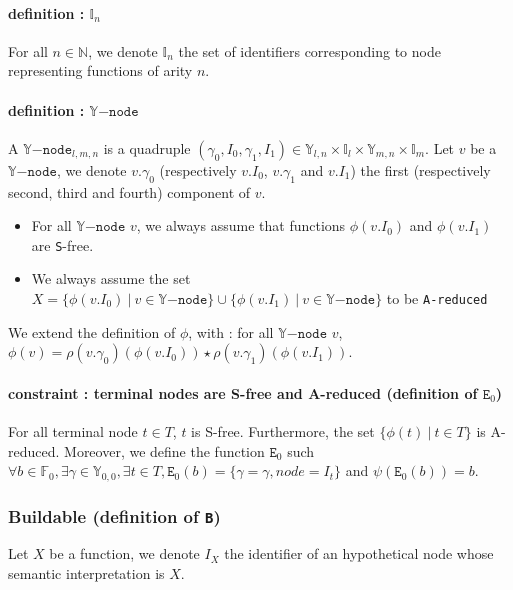 \documentclass[a4paper,10pt]{article}
\newcommand{\N}{\mathbb{N}}%
\newcommand{\F}{\mathbb{F}}%
\newcommand{\Y}{\mathbb{Y}}%
\newcommand{\I}{\mathbb{I}}%
\newcommand{\Ynode}{\Y\mathtt{-node}}
\begin{document}
\paragraph{definition : $\I_n$\\}
For all $n\in\N$, we denote $\I_n$ the set of identifiers corresponding to node representing functions of arity $n$.

\paragraph{definition : $\Ynode$\\}
A $\Ynode_{l, m, n}$ is a quadruple $(\gamma_0, I_0, \gamma_1, I_1) \in \Y_{l, n} \times \I_l \times \Y_{m, n} \times \I_m$. Let $v$ be a $\Ynode$, we denote $v.\gamma_0$ (respectively $v.I_0$, $v.\gamma_1$ and $v.I_1$) the first (respectively second, third and fourth) component of $v$.
\begin{itemize}
\item For all $\Ynode$ $v$, we always assume that functions $\phi(v.I_0)$ and $\phi(v.I_1)$ are \texttt{S}-free.
\item We always assume the set $X = \{\phi(v.I_0) ~|~ v \in\Ynode\} \cup \{\phi(v.I_1) ~|~ v\in\Ynode\}$ to be \texttt{A-reduced}
\end{itemize}
We extend the definition of $\phi$, with : for all $\Ynode$ $v$, $\phi(v) = \rho(v.\gamma_0)(\phi(v.I_0)) \star \rho(v.\gamma_1)(\phi(v.I_1))$.

\paragraph{constraint : terminal nodes are S-free and A-reduced (definition of $\mathtt{E}_0$)}
For all terminal node $t \in T$, $t$ is S-free.
Furthermore, the set $\{\phi(t) ~|~ t\in T\}$ is A-reduced.
Moreover, we define the function $\mathtt{E}_0$ such $\forall b\in\F_0, \exists \gamma\in\Y_{0, 0}, \exists t\in T, \mathtt{E}_0(b) = \{\gamma = \gamma, node = I_t\}$ and $\psi(\mathtt{E}_0(b)) = b$.


\subsubsection{Buildable (definition of \texttt{B})}

Let $X$ be a function, we denote $I_X$ the identifier of an hypothetical node whose semantic interpretation is $X$.
\end{document}
